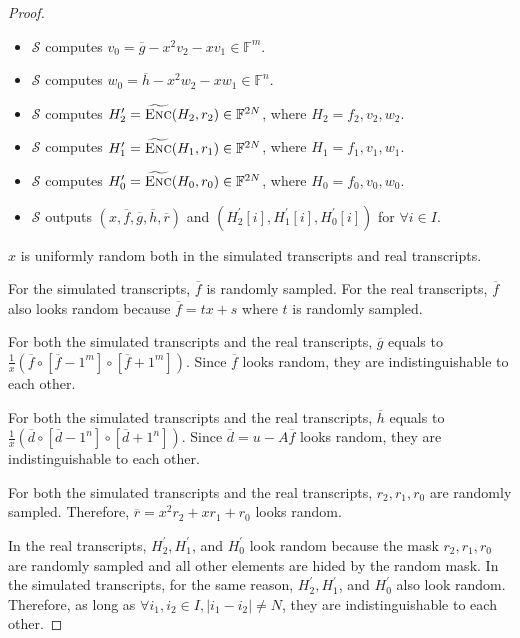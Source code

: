 \begin{proof}
\begin{itemize}
    \item $\mathcal{S}$ computes $v_0 = \overline{g} - x^2 v_2 - x v_1 \in \mathbb{F}^m$.

    \item $\mathcal{S}$ computes $w_0 = \overline{h} - x^2 w_2 - x w_1 \in \mathbb{F}^n$.  
    
    \item $\mathcal{S}$ computes $H_2^\prime = \widetilde{\textsc{Enc}}(H_2, r_2) \in \mathbb{F}^{2N}$, where $H_2 = f_2, v_2, w_2$.

    \item $\mathcal{S}$ computes $H_1^\prime = \widetilde{\textsc{Enc}}(H_1, r_1) \in \mathbb{F}^{2N}$, where $H_1 = f_1, v_1, w_1$.

    \item $\mathcal{S}$ computes $H_0^\prime = \widetilde{\textsc{Enc}}(H_0, r_0) \in \mathbb{F}^{2N}$, where $H_0 = f_0, v_0, w_0$.
    
    \item $\mathcal{S}$ outputs $(x, \overline{f}, \overline{g}, \overline{h}, \overline{r})$ and $(H_2^\prime[i], H_1^\prime[i], H_0^\prime[i])$ for $\forall i \in I$.
\end{itemize}

$x$ is uniformly random both in the simulated transcripts and real transcripts. 

For the simulated transcripts, $\overline{f}$ is randomly sampled. For the real transcripts, $\overline{f}$ also looks random because $\overline{f} = tx + s$ where $t$ is randomly sampled.

For both the simulated transcripts and the real transcripts, $\overline{g}$ equals to $\frac{1}{x} (\overline{f} \circ [\overline{f} - 1^m] \circ [\overline{f} + 1^m])$. Since $\overline{f}$ looks random, they are indistinguishable to each other.

For both the simulated transcripts and the real transcripts, $\overline{h}$ equals to $\frac{1}{x} (\overline{d} \circ [\overline{d} - 1^n] \circ [\overline{d} + 1^n])$. Since $\overline{d} = u - A\overline{f}$ looks random, they are indistinguishable to each other.

For both the simulated transcripts and the real transcripts, $r_2, r_1, r_0$ are randomly sampled. Therefore, $\overline{r} = x^2 r_2 + x r_1 + r_0$ looks random.

In the real transcripts, $H_2^\prime, H_1^\prime$, and $H_0^\prime$ look random because the mask $r_2, r_1, r_0$ are randomly sampled and all other elements are hided by the random mask. In the simulated transcripts, for the same reason, $H_2^\prime, H_1^\prime$, and $H_0^\prime$ also look random. Therefore, as long as $\forall i_1, i_2 \in I, |i_1 - i_2| \neq N$, they are indistinguishable to each other.

\end{proof}
